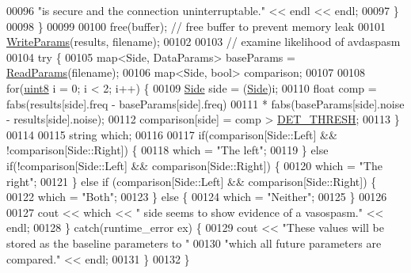 \begin{DoxyCode}
00096                 \textcolor{stringliteral}{"is secure and the connection uninterruptable."} << endl << endl;
00097         \}
00098     \}
00099 
00100     free(buffer);  \textcolor{comment}{// free buffer to prevent memory leak}
00101     \hyperlink{namespaceavda_a1e3f5a0eb4ee9a7010d57dc38bd8dfec}{WriteParams}(results, filename);
00102 
00103     \textcolor{comment}{// examine likelihood of avdaspasm}
00104     \textcolor{keywordflow}{try} \{
00105         map<Side, DataParams> baseParams = \hyperlink{namespaceavda_a46dc980b65ddfc24749ce25c1290e158}{ReadParams}(filename);
00106         map<Side, bool> comparison;
00107 
00108         \textcolor{keywordflow}{for}(\hyperlink{definitions_8hpp_adde6aaee8457bee49c2a92621fe22b79}{uint8} i = 0; i < 2; i++) \{
00109             \hyperlink{namespaceavda_af723e82f0d3d45fda6fdc01f6a492786}{Side} side = (\hyperlink{namespaceavda_af723e82f0d3d45fda6fdc01f6a492786}{Side})i;
00110             \textcolor{keywordtype}{float} comp = fabs(results[side].freq - baseParams[side].freq) 
00111                 * fabs(baseParams[side].noise - results[side].noise);
00112             comparison[side] = comp > \hyperlink{definitions_8hpp_aa15adfcc96559f1b86210d217edd3afc}{DET\_THRESH};
00113         \}
00114 
00115         \textcolor{keywordtype}{string} which;
00116 
00117         \textcolor{keywordflow}{if}(comparison[Side::Left] && !comparison[Side::Right]) \{
00118             which = \textcolor{stringliteral}{"The left"};
00119         \} \textcolor{keywordflow}{else} \textcolor{keywordflow}{if}(!comparison[Side::Left] && comparison[Side::Right]) \{
00120             which = \textcolor{stringliteral}{"The right"};
00121         \} \textcolor{keywordflow}{else} \textcolor{keywordflow}{if} (comparison[Side::Left] && comparison[Side::Right]) \{
00122             which = \textcolor{stringliteral}{"Both"};
00123         \} \textcolor{keywordflow}{else} \{
00124             which = \textcolor{stringliteral}{"Neither"};
00125         \}
00126 
00127         cout << which << \textcolor{stringliteral}{" side seems to show evidence of a vasospasm."} << endl;
00128     \} \textcolor{keywordflow}{catch}(runtime\_error ex) \{
00129         cout << \textcolor{stringliteral}{"These values will be stored as the baseline parameters to "}
00130             \textcolor{stringliteral}{"which all future parameters are compared."} << endl;
00131     \}
00132 \}
\end{DoxyCode}
